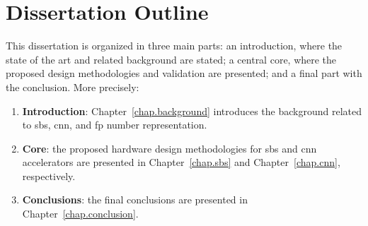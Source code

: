 \section{Dissertation Outline}

This dissertation is organized in three main parts: an introduction, where
the state of the art and related background are stated; a central core, where the proposed design methodologies and validation are presented; and a final part with the conclusion. More precisely:

\begin{enumerate}[I]
	\item \textbf{Introduction}: Chapter~\ref{chap.background} introduces the background related to \gls{sbs}, \gls{cnn}, and \gls{fp} number representation.
	\item \textbf{Core}: the proposed hardware design methodologies for \gls{sbs} and \gls{cnn} accelerators are presented in Chapter~\ref{chap.sbs} and Chapter~\ref{chap.cnn}, respectively.
	\item \textbf{Conclusions}: the final conclusions are presented in Chapter~\ref{chap.conclusion}.
\end{enumerate}